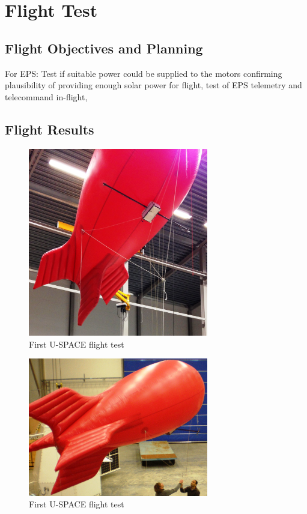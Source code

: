 \newpage
\chapter{Flight Test}
\label{chap:flight_test}

\section{Flight Objectives and Planning}

For EPS: Test if suitable power could be supplied to the motors confirming plausibility of providing enough solar power for flight, test of EPS telemetry and telecommand in-flight,  

\section{Flight Results}



\begin{figure}[H]
\centering
\includegraphics[width=0.7\textwidth]{figures/fig_FlightTest1_1}
\caption{First U-SPACE flight test}
\label{fig:FlightTest1_1}
\end{figure}

\begin{figure}[H]
\centering
\includegraphics[width=0.7\textwidth]{figures/fig_FlightTest1_2}
\caption{First U-SPACE flight test}
\label{fig:FlightTest1_2}
\end{figure}




